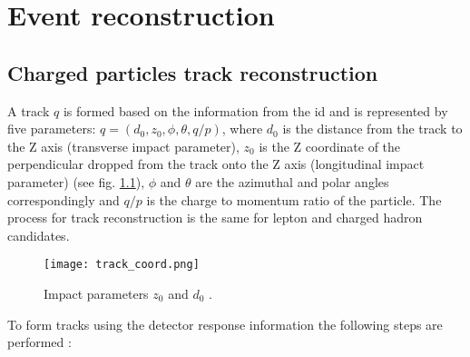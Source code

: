 \chapter{Event reconstruction}
    \section{Charged particles track reconstruction}
    \label{sec::tracking}
    A track $q$ is formed based on the information from the \gls{id} and is represented by five parameters: $q = (d_0,z_0,\phi,\theta,q/p)$, where $d_0$ is the distance from the track to the Z axis (transverse impact parameter), $z_0$ is the Z coordinate of the perpendicular dropped from the track onto the Z axis (longitudinal impact parameter) (see fig. \ref{fig::z0d0}), $\phi$ and $\theta$ are the azimuthal and polar angles correspondingly and $q/p$ is the charge to momentum ratio of the particle. The process for track reconstruction is the same for lepton and charged hadron candidates. \\
        	\begin{figure}[htbp]
        		\centering
    		\texttt{[image: track\_coord.png]}
    		\caption[Impact parameters]{Impact parameters $z_0$ and $d_0$ \cite{ATLAS:track}.}
    		\label{fig::z0d0}
  			 \end{figure}
  	To form tracks using the detector response information the following steps are performed \cite{ATLAS:track2}:
